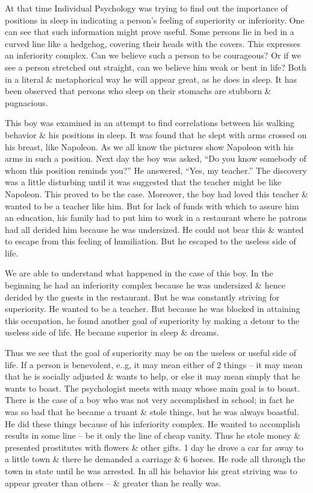 \documentclass{article}
\begin{document}
At that time Individual Psychology was trying to find out the importance of positions in sleep in indicating a person's feeling of superiority or inferiority. One can see that such information might prove useful. Some persons lie in bed in a curved line like a hedgehog, covering their heads with the covers. This expresses an inferiority complex. Can we believe such a person to be courageous? Or if we see a person stretched out straight, can we believe him weak or bent in life? Both in a literal \& metaphorical way he will appear great, as he does in sleep. It has been observed that persons who sleep on their stomachs are stubborn \& pugnacious.

This boy was examined in an attempt to find correlations between his walking behavior \& his positions in sleep. It was found that he slept with arms crossed on his breast, like Napoleon. As we all know the pictures show Napoleon with his arms in such a position. Next day the boy was asked, ``Do you know somebody of whom this position reminds you?'' He answered, ``Yes, my teacher.'' The discovery was a little disturbing until it was suggested that the teacher might be like Napoleon. This proved to be the case. Moreover, the boy had loved this teacher \& wanted to be a teacher like him. But for lack of funds with which to assure him an education, his family had to put him to work in a restaurant where he patrons had all derided him because he was undersized. He could not bear this \& wanted to escape from this feeling of humiliation. But he escaped to the useless side of life.

We are able to understand what happened in the case of this boy. In the beginning he had an inferiority complex because he was undersized \& hence derided by the guests in the restaurant. But he was constantly striving for superiority. He wanted to be a teacher. But because he was blocked in attaining this occupation, he found another goal of superiority by making a detour to the useless side of life. He became superior in sleep \& dreams.

Thus we see that the goal of superiority may be on the useless or useful side of life. If a person is benevolent, e..g, it may mean either of 2 things -- it may mean that he is socially adjusted \& wants to help, or else it may mean simply that he wants to boast. The psychologist meets with many whose main goal is to boast. There is the case of a boy who was not very accomplished in school; in fact he was so bad that he became a truant \& stole things, but he was always boastful. He did these things because of his inferiority complex. He wanted to accomplish results in some line -- be it only the line of cheap vanity. Thus he stole money \& presented prostitutes with flowers \& other gifts. 1 day he drove a car far away to a little town \& there he demanded a carriage \& 6 horses. He rode all through the town in state until he was arrested. In all his behavior his great striving was to appear greater than others -- \& greater than he really was.
\end{document}
